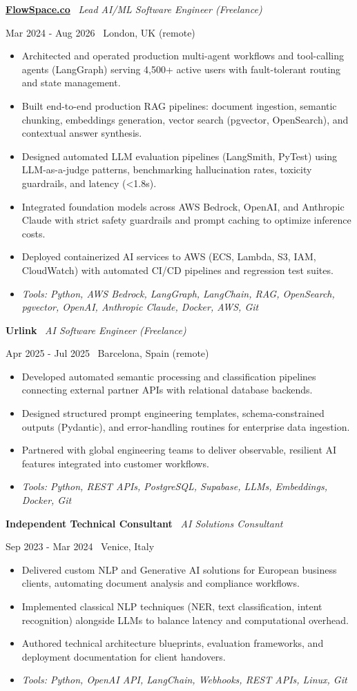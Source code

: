 \documentclass[a4paper,10pt]{article}
\newcommand{\role}[4]{%
  \vspace{2pt}\noindent
  \begin{minipage}[t]{0.70\textwidth}\raggedright\textbf{#1} \textbullet\ \textit{#3}\end{minipage}%
  \hfill
  \begin{minipage}[t]{0.28\textwidth}\raggedleft\footnotesize\color{gray}#2 \textbullet\ #4\end{minipage}%
  \vspace{1pt}%
}
\begin{document}
\role{\href{https://flowspace.co}{FlowSpace.co}}{Mar 2024 - Aug 2026}{Lead AI/ML Software Engineer (Freelance)}{London, UK (remote)}
\begin{itemize}
  \item Architected and operated production multi-agent workflows and tool-calling agents (LangGraph) serving 4,500+ active users with fault-tolerant routing and state management.
  \item Built end-to-end production RAG pipelines: document ingestion, semantic chunking, embeddings generation, vector search (pgvector, OpenSearch), and contextual answer synthesis.
  \item Designed automated LLM evaluation pipelines (LangSmith, PyTest) using LLM-as-a-judge patterns, benchmarking hallucination rates, toxicity guardrails, and latency (<1.8s).
  \item Integrated foundation models across AWS Bedrock, OpenAI, and Anthropic Claude with strict safety guardrails and prompt caching to optimize inference costs.
  \item Deployed containerized AI services to AWS (ECS, Lambda, S3, IAM, CloudWatch) with automated CI/CD pipelines and regression test suites.
  \item \textit{Tools: Python, AWS Bedrock, LangGraph, LangChain, RAG, OpenSearch, pgvector, OpenAI, Anthropic Claude, Docker, AWS, Git}
\end{itemize}

\role{Urlink}{Apr 2025 - Jul 2025}{AI Software Engineer (Freelance)}{Barcelona, Spain (remote)}
\begin{itemize}
  \item Developed automated semantic processing and classification pipelines connecting external partner APIs with relational database backends.
  \item Designed structured prompt engineering templates, schema-constrained outputs (Pydantic), and error-handling routines for enterprise data ingestion.
  \item Partnered with global engineering teams to deliver observable, resilient AI features integrated into customer workflows.
  \item \textit{Tools: Python, REST APIs, PostgreSQL, Supabase, LLMs, Embeddings, Docker, Git}
\end{itemize}

\role{Independent Technical Consultant}{Sep 2023 - Mar 2024}{AI Solutions Consultant}{Venice, Italy}
\begin{itemize}
  \item Delivered custom NLP and Generative AI solutions for European business clients, automating document analysis and compliance workflows.
  \item Implemented classical NLP techniques (NER, text classification, intent recognition) alongside LLMs to balance latency and computational overhead.
  \item Authored technical architecture blueprints, evaluation frameworks, and deployment documentation for client handovers.
  \item \textit{Tools: Python, OpenAI API, LangChain, Webhooks, REST APIs, Linux, Git}
\end{itemize}
\end{document}
